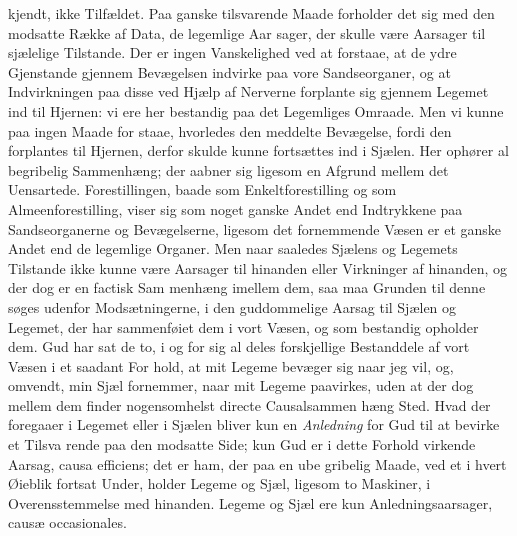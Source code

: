 \documentclass[12pt,a4paper]{book}
\begin{document}
kjendt, ikke Tilfældet. Paa ganske tilsvarende Maade forholder
det sig med den modsatte Række af Data, de legemlige Aar\-%
sager, der skulle være Aarsager til sjælelige Tilstande. Der er
ingen Vanskelighed ved at forstaae, at de ydre Gjenstande
gjennem Bevægelsen indvirke paa vore Sandseorganer, og at
Indvirkningen paa disse ved Hjælp af Nerverne forplante sig
gjennem Legemet ind til Hjernen: vi ere her bestandig paa det
Legemliges Omraade. Men vi kunne paa ingen Maade for\-%
staae, hvorledes den meddelte Bevægelse, fordi den forplantes
til Hjernen, derfor skulde kunne fortsættes ind i Sjælen. Her
ophører al begribelig Sammenhæng; der aabner sig ligesom en
Afgrund mellem det Uensartede. Forestillingen, baade som
Enkeltforestilling og som Almeenforestilling, viser sig som
noget ganske Andet end Indtrykkene paa Sandseorganerne og
Bevægelserne, ligesom det fornemmende Væsen er et ganske
Andet end de legemlige Organer. Men naar saaledes Sjælens
og Legemets Tilstande ikke kunne være Aarsager til hinanden
eller Virkninger af hinanden, og der dog er en factisk Sam\-%
menhæng imellem dem, saa maa Grunden til denne søges
udenfor Modsætningerne, i den guddommelige Aarsag til Sjælen
og Legemet, der har sammenføiet dem i vort Væsen, og som
bestandig opholder dem. Gud har sat de to, i og for sig al\-%
deles forskjellige Bestanddele af vort Væsen i et saadant For\-%
hold, at mit Legeme bevæger sig naar jeg vil, og, omvendt,
min Sjæl fornemmer, naar mit Legeme paavirkes, uden at der
dog mellem dem finder nogensomhelst directe Causalsammen\-%
hæng Sted. Hvad der foregaaer i Legemet eller i Sjælen
bliver kun en \emph{Anledning} for Gud til at bevirke et Tilsva\-%
rende paa den modsatte Side; kun Gud er i dette Forhold
virkende Aarsag, causa efficiens; det er ham, der paa en ube\-%
gribelig Maade, ved et i hvert Øieblik fortsat Under, holder
Legeme og Sjæl, ligesom to Maskiner, i Overensstemmelse med
hinanden. Legeme og Sjæl ere kun Anledningsaarsager,
causæ occasionales.
\end{document}
